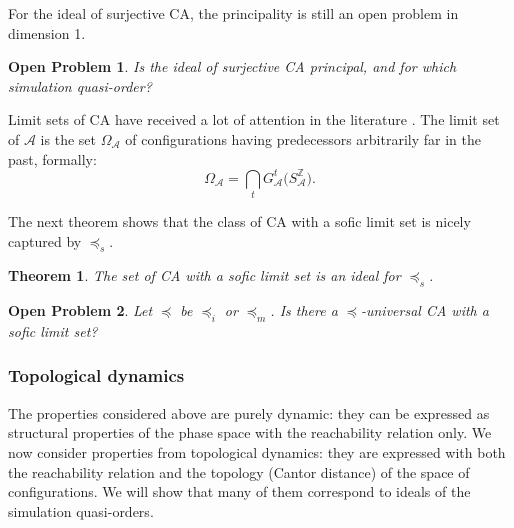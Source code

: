 \documentclass[a4paper]{elsarticle}
\def\qed{\relax\ifmmode\hskip2em \blacksquare\else\unskip\nobreak\hfill\hskip1em $\blacksquare$\fi}
\newcommand{\ZZ}{\mathbb{Z}}
\newcommand{\ACA}{\mathcal{A}}
\newcommand{\ACB}{\mathcal{B}}
\newcommand{\globA}{G_{\ACA}}
\newcommand{\globB}{G_{\ACB}}
\newcommand\alphabe[1]{S_{#1}}
\newcommand{\alphA}{\alphabe{\ACA}}
\newcommand{\alphB}{\alphabe{\ACB}}
\newcommand{\unif}{\overline}
\newcommand{\fac}{\trianglelefteq}
\newcommand{\simu}{\preccurlyeq}
\newcommand{\sacsimu}{\simu_i}
\newcommand{\facsimu}{\simu_s}
\newcommand{\facsacsimu}{\simu_m}
\newtheorem{thm}{Theorem}[section]
\newtheorem{openpb}{Open Problem}
\begin{document}
For the ideal of surjective CA, the principality is still an open
problem in dimension 1.

\begin{openpb}
  \label{open:surjideal}
  Is the ideal of surjective CA principal, and for which simulation
  quasi-order?
\end{openpb}

Limit sets of CA have received a lot of attention in the literature
\cite{Culik89, hur87, goles93}. The limit set of $\ACA$ is the set
$\Omega_\ACA$ of configurations having predecessors arbitrarily far in
the past, formally:
\[\Omega_\ACA = \bigcap_t \globA^t\bigl(\alphA^\ZZ\bigr).\]

The next theorem shows that the class of CA with a sofic limit set is
nicely captured by $\facsimu$.

\begin{thm}
  \label{thm:soficideal}
  The set of CA with a sofic limit set is an ideal for $\facsimu$.
\end{thm}

\begin{openpb}
  Let $\simu$ be $\sacsimu$ or $\facsacsimu$. Is there a $\simu$-universal CA
  with a sofic limit set?
\end{openpb}

\subsubsection{Topological dynamics}

The properties considered above are purely dynamic: they can be
expressed as structural properties of the phase space with the
reachability relation only. We now consider properties from
topological dynamics: they are expressed with both the reachability
relation and the topology (Cantor distance) of the space of
configurations.  We will show that many of them correspond to ideals
of the simulation quasi-orders.
\end{document}
